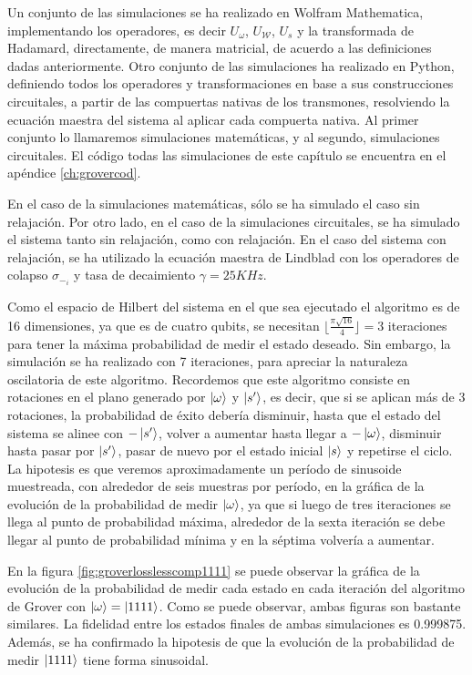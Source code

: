 Un conjunto de las simulaciones se ha realizado en Wolfram Mathematica, implementando los operadores, es decir $U_{\omega}$, $U_\mathcal{W}$, $U_s$ y la transformada de Hadamard, directamente, de manera matricial, de acuerdo a las definiciones dadas anteriormente. Otro conjunto de las simulaciones ha realizado en Python, definiendo todos los operadores y transformaciones en base a sus construcciones circuitales, a partir de las compuertas nativas de los transmones, resolviendo la ecuación maestra del sistema al aplicar cada compuerta nativa. Al primer conjunto lo llamaremos simulaciones matemáticas, y al segundo, simulaciones circuitales. El código todas las simulaciones de este capítulo se encuentra en el apéndice \ref{ch:grovercod}.

En el caso de la simulaciones matemáticas, sólo se ha simulado el caso sin relajación. Por otro lado, en el caso de la simulaciones circuitales, se ha simulado el sistema tanto sin relajación, como con relajación. En el caso del sistema con relajación, se ha utilizado la ecuación maestra de Lindblad con los operadores de colapso $\sigma_{-_i}$ y tasa de decaimiento $\gamma = 25KHz$.

Como el espacio de Hilbert del sistema en el que sea ejecutado el algoritmo es de 16 dimensiones, ya que es de cuatro qubits, se necesitan $\lfloor \frac{\pi \sqrt{16}}{4} \rfloor = 3$ iteraciones para tener la máxima probabilidad de medir el estado deseado. Sin embargo, la simulación se ha realizado con 7 iteraciones, para apreciar la naturaleza oscilatoria de este algoritmo. Recordemos que este algoritmo consiste en rotaciones en el plano generado por $\ket{\omega}$ y $\ket{s^\prime}$, es decir, que si se aplican más de 3 rotaciones, la probabilidad de éxito debería disminuir, hasta que el estado del sistema se alinee con $- \ket{s^\prime}$, volver a aumentar hasta llegar a $- \ket{\omega}$, disminuir hasta pasar por $\ket{s^\prime}$, pasar de nuevo por el estado inicial $\ket{s}$ y repetirse el ciclo. La hipotesis es que veremos aproximadamente un período de sinusoide muestreada, con alrededor de seis muestras por período, en la gráfica de la evolución de la probabilidad de medir $\ket{\omega}$, ya que si luego de tres iteraciones se llega al punto de probabilidad máxima, alrededor de la sexta iteración se debe llegar al punto de probabilidad mínima y en la séptima volvería a aumentar.

En la figura \ref{fig:groverlosslesscomp1111} se puede observar la gráfica de la evolución de la probabilidad de medir cada estado en cada iteración del algoritmo de Grover con $\ket{\omega} = \ket{1111}$. Como se puede observar, ambas figuras son bastante similares. La fidelidad entre los estados finales de ambas simulaciones es 0.999875. Además, se ha confirmado la hipotesis de que la evolución de la probabilidad de medir $\ket{1111}$ tiene forma sinusoidal.

